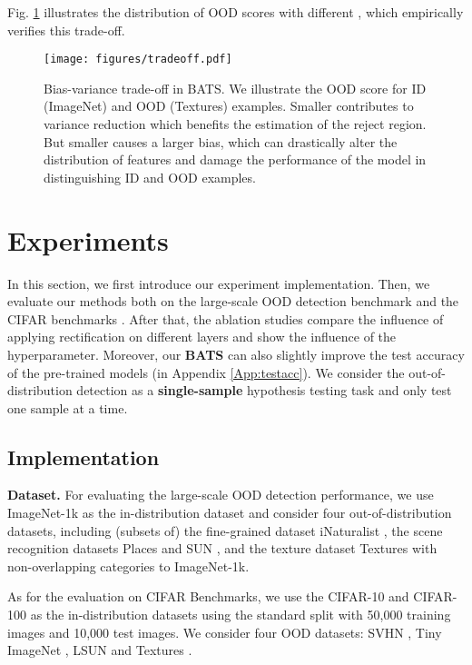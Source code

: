 \documentclass{article}
\begin{document}
Fig. \ref{img:tradeoff} illustrates the distribution of OOD scores with different , which empirically verifies this trade-off.
\begin{figure}[htbp]
\centering
\texttt{[image: figures/tradeoff.pdf]}
\caption{Bias-variance trade-off in BATS. We illustrate the OOD score for ID (ImageNet) and OOD (Textures) examples. Smaller  contributes to variance reduction which benefits the estimation of the reject region. But smaller  causes a larger bias, which can drastically alter the distribution of features and damage the performance of the model in distinguishing ID and OOD examples.}
\vspace{-0.3cm}
\label{img:tradeoff}
\end{figure}


\section{Experiments}
In this section, we first introduce our experiment implementation. Then, we evaluate our methods both on the large-scale OOD detection benchmark \cite{huang2021mos} and the CIFAR benchmarks \cite{hendrycks17baseline}. After that, the ablation studies compare the influence of applying rectification on different layers and show the influence of the hyperparameter. Moreover, our \textbf{BATS} can also slightly improve the test accuracy of the pre-trained models (in Appendix \ref{App:testacc}). We consider the out-of-distribution detection as a \textbf{single-sample} hypothesis testing task and only test one sample at a time.
\subsection{Implementation}
\textbf{Dataset.} 
For evaluating the large-scale OOD detection performance, we use ImageNet-1k \cite{huang2021mos} as the in-distribution dataset and consider four out-of-distribution datasets, including (subsets of) the fine-grained dataset iNaturalist \cite{van2018inaturalist}, the scene recognition datasets Places \cite{zhou2017places} and SUN \cite{xiao2010sun}, and the texture dataset Textures \cite{cimpoi2014Texture} with non-overlapping categories to ImageNet-1k. 

As for the evaluation on CIFAR Benchmarks, we use the CIFAR-10 and CIFAR-100 \cite{krizhevsky2009learningCIFAR} as the in-distribution datasets using the standard split with 50,000 training images and 10,000 test images. We consider four OOD datasets: SVHN \cite{netzer2011readingSVHN}, Tiny ImageNet \cite{chrabaszcz2017downsampledTiny}, LSUN \cite{yu2015lsun} and Textures \cite{cimpoi2014Texture}. 
\end{document}
